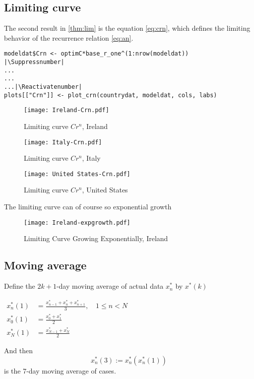 \subsection{Limiting curve}

The second result in \ref{thm:lim} is the equation \ref{eq:crn}, which defines the limiting behavior of the recurrence relation \ref{eq:an}.

\begin{lstlisting}[breaklines = true, escapeinside=||, tabsize = 4, caption = {Algorithm for Limiting Curve}]
modeldat$Crn <- optimC*base_r_one^(1:nrow(modeldat))  |\Suppressnumber|
...
...
...|\Reactivatenumber|
plots[["Crn"]] <- plot_crn(countrydat, modeldat, cols, labs)
\end{lstlisting}

\begin{figure}[H]
\texttt{[image: Ireland-Crn.pdf]}
\caption{Limiting curve $Cr^n$, Ireland}
\endminipage 
{}
\texttt{[image: Italy-Crn.pdf]}
\caption{Limiting curve $Cr^n$, Italy}
\endminipage 
{}
\texttt{[image: United States-Crn.pdf]}
\caption{Limiting curve $Cr^n$, United States}
\endminipage 
\end{figure}

The limiting curve can of course so exponential growth 

\begin{figure}[H]
\texttt{[image: Ireland-expgrowth.pdf]}
\endminipage 
\caption{Limiting Curve Growing Exponentially, Ireland}
\end{figure}

\subsection{Moving average}

Define the $2k+1$-day moving average of actual data $x_n^*$ by $x^*(k)$

$\begin{aligned}
x^*_n(1) &=\frac{x^*_{n-1} + x^*_n + x^*_{n+1}}{3},\quad 1\leq n < N \\
x^*_0(1) &=\frac{x^*_0 + x^*_1}{2}\\
x^*_N(1) &=\frac{x^*_{N-1} + x^*_N}{2}
\end{aligned}$

And then $$x_n^*(3):= x^*_n(x^*_n(1))$$ is the 7-day moving average of cases.

